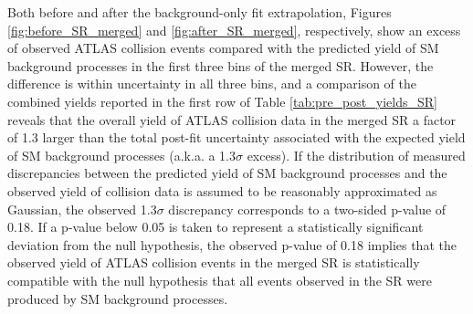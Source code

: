 Both before and after the background-only fit extrapolation, Figures \ref{fig:before_SR_merged} and \ref{fig:after_SR_merged}, respectively, show an excess of observed ATLAS collision events compared with the predicted yield of SM background processes in the first three bins of the merged SR. However, the difference is within uncertainty in all three bins, and a comparison of the combined yields reported in the first row of Table \ref{tab:pre_post_yields_SR} reveals that the overall yield of ATLAS collision data in the merged SR a factor of 1.3 larger than the total post-fit uncertainty associated with the expected yield of SM background processes (a.k.a. a 1.3\(\sigma\) excess). If the distribution of measured discrepancies between the predicted yield of SM background processes and the observed yield of collision data is assumed to be reasonably approximated as Gaussian, the observed 1.3\(\sigma\) discrepancy corresponds to a two-sided p-value \cite{Stats_2003} of 0.18. If a p-value below 0.05 is taken to represent a statistically significant deviation from the null hypothesis, the observed p-value of 0.18 implies that the observed yield of ATLAS collision events in the merged SR is statistically compatible with the null hypothesis that all events observed in the SR were produced by SM background processes. 

%

